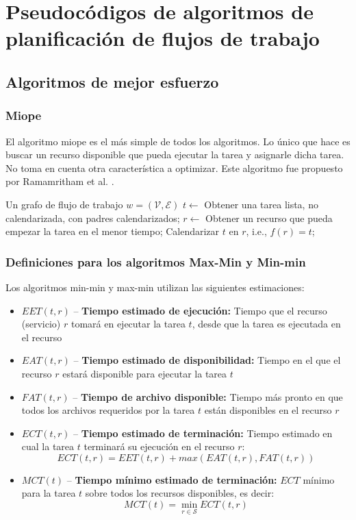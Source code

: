 \chapter{Pseudocódigos de algoritmos de planificación de flujos de trabajo}

\section{Algoritmos de mejor esfuerzo}
\subsection{Miope}
El algoritmo miope \cite{yu2008workflow} es el más simple de todos los algoritmos. Lo único que hace es buscar un recurso disponible que pueda ejecutar la tarea y asignarle dicha tarea. No toma en cuenta otra característica a optimizar. Este algoritmo fue propuesto por Ramamritham et al. \cite{ramamritham1990efficient}. 

\label{alg:myopic}
\begin{algorithmic}[1]
\Require Un grafo de flujo de trabajo $w=(\mathcal{V}, \mathcal{E})$
	\State $t \gets$ Obtener una tarea lista, no calendarizada, con padres calendarizados;
	\State $r \gets$ Obtener un recurso que pueda empezar la tarea en el menor tiempo;
	\State Calendarizar $t$ en $r$, i.e., $f(r) = t$;
\EndWhile
\end{algorithmic}

\subsection{Definiciones para los algoritmos Max-Min y Min-min}
Los algoritmos min-min y max-min utilizan las siguientes  estimaciones: %
\begin{itemize}
\item{$EET(t,r)$ -- \textbf{Tiempo estimado de ejecución:} Tiempo que el recurso (servicio) $r$ tomará en ejecutar la tarea $t$, desde que la tarea es ejecutada en el recurso}
\item{$EAT(t,r)$ -- \textbf{Tiempo estimado de disponibilidad:} Tiempo en el que el recurso $r$ estará disponible para ejecutar la tarea $t$}
\item{$FAT(t,r)$ -- \textbf{Tiempo de archivo disponible:} Tiempo más pronto en que todos los archivos requeridos por la tarea $t$ están disponibles en el recurso $r$}
\item{$ECT(t,r)$ -- \textbf{Tiempo estimado de terminación:} Tiempo estimado en cual la tarea $t$ terminará su ejecución en el recurso $r$: 
              \[ ECT(t,r) = EET(t,r) + max(EAT(t,r), FAT(t,r)) \]}
\item{$MCT(t)$ -- \textbf{Tiempo mínimo estimado de terminación: } $ECT$ mínimo para la tarea $t$ sobre todos los recursos disponibles, es decir: 
            \[ MCT(t) = \min_{r \in \mathcal{S}} ECT(t,r) \]}
\end{itemize}

